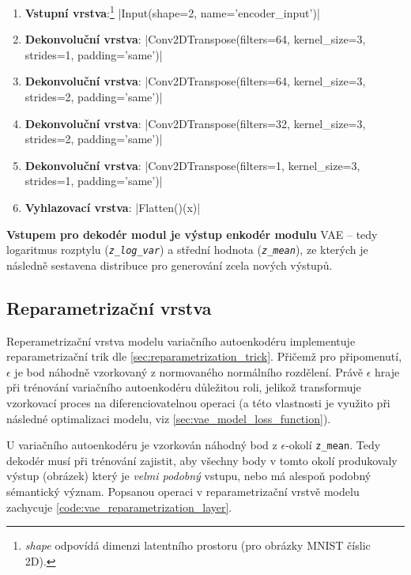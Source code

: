 \begin{enumerate}
    \item \textbf{Vstupní vrstva}:\footnote{\emph{shape} odpovídá dimenzi latentního prostoru (pro obrázky MNIST číslic 2D).} |Input(shape=2, name='encoder_input')|
    \item \textbf{Dekonvoluční vrstva}: |Conv2DTranspose(filters=64, kernel_size=3, strides=1, padding='same')|
    \item \textbf{Dekonvoluční vrstva}: |Conv2DTranspose(filters=64, kernel_size=3, strides=2, padding='same')|
    \item \textbf{Dekonvoluční vrstva}: |Conv2DTranspose(filters=32, kernel_size=3, strides=2, padding='same')|
    \item \textbf{Dekonvoluční vrstva}: |Conv2DTranspose(filters=1, kernel_size=3, strides=1, padding='same')|
    \item \textbf{Vyhlazovací vrstva}: |Flatten()(x)|
\end{enumerate}

\textbf{Vstupem pro dekodér modul je výstup enkodér modulu} VAE – tedy logaritmus rozptylu (\emph{\lstinline{z_log_var}}) a střední hodnota (\emph{\lstinline{z_mean}}), ze kterých je následně sestavena distribuce pro generování zcela nových výstupů.

\subsection{Reparametrizační vrstva}
\label{sec:vae_model_reparametrization_layer}
Reperametrizační vrstva modelu variačního autoenkodéru implementuje reparametrizační trik dle \autoref{sec:reparametrization_trick}.
Přičemž pro připomenutí, $\epsilon$ je bod náhodně vzorkovaný z normovaného normálního rozdělení.
Právě $\epsilon$ hraje při trénování variačního autoenkodéru důležitou roli, jelikož transformuje vzorkovací proces na diferenciovatelnou operaci (a této vlastnosti je využito při následné optimalizaci modelu, viz \autoref{sec:vae_model_loss_function}).


U variačního autoenkodéru je vzorkován náhodný bod z $\epsilon$-okolí \lstinline{z_mean}.
Tedy dekodér musí při trénování zajistit, aby všechny body v tomto okolí produkovaly výstup (obrázek) který je \emph{velmi podobný} vstupu, nebo má alespoň podobný sémantický význam.
Popsanou operaci v reparametrizační vrstvě modelu zachycuje \autoref{code:vae_reparametrization_layer}.

